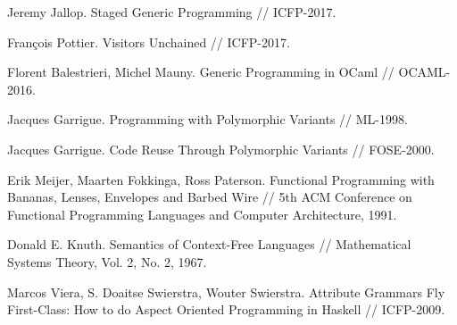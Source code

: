 \documentclass[twocolumn,8pt]{extarticle}
\begin{document}
{
\small
\begin{thebibliography}{99}
 Jeremy Jallop. Staged Generic Programming // ICFP-2017.

Fran\c{c}ois Pottier. Visitors Unchained // ICFP-2017.

Florent Balestrieri, Michel Mauny. Generic Programming in OCaml // OCAML-2016.

Jacques Garrigue. Programming with Polymorphic Variants // ML-1998.

Jacques Garrigue. Code Reuse Through Polymorphic Variants // FOSE-2000.


Erik Meijer, Maarten Fokkinga, Ross Paterson. Functional Programming with Bananas, Lenses, 
Envelopes and Barbed Wire // 5th ACM Conference on Functional Programming Languages and 
Computer Architecture, 1991.

Donald E. Knuth. Semantics of Context-Free Languages //
Mathematical Systems Theory, Vol. 2, No. 2, 1967.

Marcos Viera, S. Doaitse Swierstra, Wouter Swierstra.
Attribute Grammars Fly First-Class: How to do Aspect Oriented Programming in Haskell //
ICFP-2009.









\end{thebibliography}}
\end{document}
